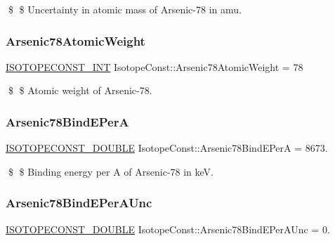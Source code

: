 \$ \$ Uncertainty in atomic mass of Arsenic-\/78 in amu. \mbox{\label{group___isotope_const-_arsenic-_as78_ga1d7dd73cdb37f574b95cb4f34e4418ad}} 
\subsubsection{\texorpdfstring{Arsenic78\+Atomic\+Weight}{Arsenic78AtomicWeight}}
{\footnotesize\ttfamily \mbox{\hyperlink{group___isotope_const-_macros_ga5f18360b3e99483a35c32d789e62621c}{I\+S\+O\+T\+O\+P\+E\+C\+O\+N\+S\+T\+\_\+\+I\+NT}} Isotope\+Const\+::\+Arsenic78\+Atomic\+Weight = 78}

\$ \$ Atomic weight of Arsenic-\/78. \mbox{\label{group___isotope_const-_arsenic-_as78_ga420401cf25e6c6cd2606d391486ec237}} 
\subsubsection{\texorpdfstring{Arsenic78\+Bind\+E\+PerA}{Arsenic78BindEPerA}}
{\footnotesize\ttfamily \mbox{\hyperlink{group___isotope_const-_macros_ga8f45a7272ce02c0b4c65c44636ed719a}{I\+S\+O\+T\+O\+P\+E\+C\+O\+N\+S\+T\+\_\+\+D\+O\+U\+B\+LE}} Isotope\+Const\+::\+Arsenic78\+Bind\+E\+PerA = 8673.}

\$ \$ Binding energy per A of Arsenic-\/78 in keV. \mbox{\label{group___isotope_const-_arsenic-_as78_gabbf61849d5938d65937c6012ecdb07f5}} 
\subsubsection{\texorpdfstring{Arsenic78\+Bind\+E\+Per\+A\+Unc}{Arsenic78BindEPerAUnc}}
{\footnotesize\ttfamily \mbox{\hyperlink{group___isotope_const-_macros_ga8f45a7272ce02c0b4c65c44636ed719a}{I\+S\+O\+T\+O\+P\+E\+C\+O\+N\+S\+T\+\_\+\+D\+O\+U\+B\+LE}} Isotope\+Const\+::\+Arsenic78\+Bind\+E\+Per\+A\+Unc = 0.}

